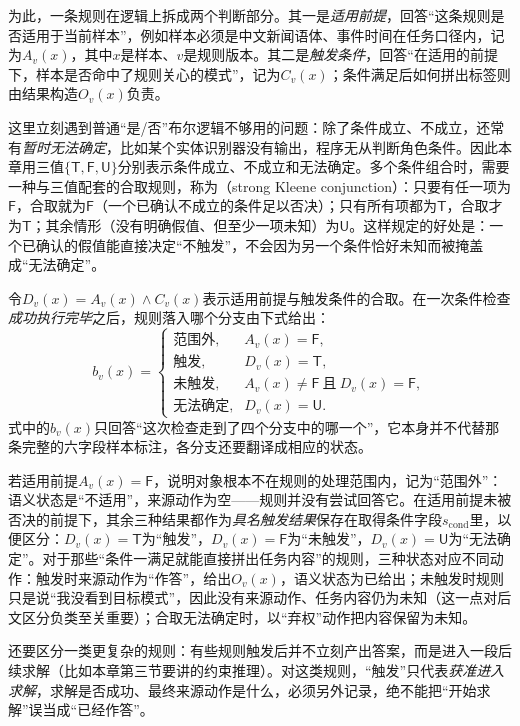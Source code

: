 为此，一条规则在逻辑上拆成两个判断部分。其一是\emph{适用前提}，回答“这条规则是否适用于当前样本”，例如样本必须是中文新闻语体、事件时间在任务口径内，记为$A_v(x)$，其中$x$是样本、$v$是规则版本。其二是\emph{触发条件}，回答“在适用的前提下，样本是否命中了规则关心的模式”，记为$C_v(x)$；条件满足后如何拼出标签则由结果构造$O_v(x)$负责。

这里立刻遇到普通“是/否”布尔逻辑不够用的问题：除了条件成立、不成立，还常有\emph{暂时无法确定}，比如某个实体识别器没有输出，程序无从判断角色条件。因此本章用三值$\{\mathsf{T},\mathsf{F},\mathsf{U}\}$分别表示条件成立、不成立和无法确定。多个条件组合时，需要一种与三值配套的合取规则，称为（strong Kleene conjunction）：只要有任一项为$\mathsf{F}$，合取就为$\mathsf{F}$（一个已确认不成立的条件足以否决）；只有所有项都为$\mathsf{T}$，合取才为$\mathsf{T}$；其余情形（没有明确假值、但至少一项未知）为$\mathsf{U}$。这样规定的好处是：一个已确认的假值能直接决定“不触发”，不会因为另一个条件恰好未知而被掩盖成“无法确定”。

令$D_v(x)=A_v(x)\land C_v(x)$表示适用前提与触发条件的合取。在一次条件检查\emph{成功执行完毕}之后，规则落入哪个分支由下式给出：
\begin{equation}
  b_v(x)=
  \begin{cases}
    \text{范围外}, & A_v(x)=\mathsf{F},\\
    \text{触发}, & D_v(x)=\mathsf{T},\\
    \text{未触发}, & A_v(x)\ne\mathsf{F}\ \text{且}\ D_v(x)=\mathsf{F},\\
    \text{无法确定}, & D_v(x)=\mathsf{U}.
  \end{cases}
  \label{eq:rule-based-knowledge-acquisition-interface}
\end{equation}
式中的$b_v(x)$只回答“这次检查走到了四个分支中的哪一个”，它本身并不代替那条完整的六字段样本标注，各分支还要翻译成相应的状态。

若适用前提$A_v(x)=\mathsf{F}$，说明对象根本不在规则的处理范围内，记为“范围外”：语义状态是“不适用”，来源动作为空——规则并没有尝试回答它。在适用前提未被否决的前提下，其余三种结果都作为\emph{具名触发结果}保存在取得条件字段$s_{\mathrm{cond}}$里，以便区分：$D_v(x)=\mathsf{T}$为“触发”，$D_v(x)=\mathsf{F}$为“未触发”，$D_v(x)=\mathsf{U}$为“无法确定”。对于那些“条件一满足就能直接拼出任务内容”的规则，三种状态对应不同动作：触发时来源动作为“作答”，给出$O_v(x)$，语义状态为已给出；未触发时规则只是说“我没看到目标模式”，因此没有来源动作、任务内容仍为未知（这一点对后文区分负类至关重要）；合取无法确定时，以“弃权”动作把内容保留为未知。

还要区分一类更复杂的规则：有些规则触发后并不立刻产出答案，而是进入一段后续求解（比如本章第三节要讲的约束推理）。对这类规则，“触发”只代表\emph{获准进入求解}，求解是否成功、最终来源动作是什么，必须另外记录，绝不能把“开始求解”误当成“已经作答”。

